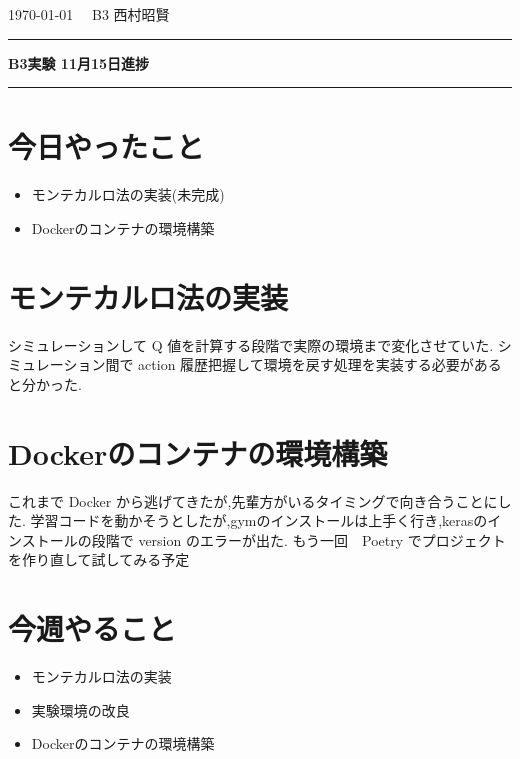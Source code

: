 \documentclass{jarticle}     %
\begin{document}
  \noindent
  \onecolumn
  \hspace{1em}
  \today
  \hfill
  \ \  B3 西村昭賢 

  \vspace{2mm}
  \hrule
  \begin{center}
  {\Large \bf B3実験 11月15日進捗}
  \end{center}
  \hrule
  \vspace{3mm}

\section{今日やったこと}

\begin{itemize}
  \item モンテカルロ法の実装(未完成)
  \item Dockerのコンテナの環境構築
\end{itemize}

\section{モンテカルロ法の実装}
シミュレーションして Q 値を計算する段階で実際の環境まで変化させていた.
シミュレーション間で action 履歴把握して環境を戻す処理を実装する必要があると分かった.

\section{Dockerのコンテナの環境構築}
これまで Docker から逃げてきたが,先輩方がいるタイミングで向き合うことにした.
学習コードを動かそうとしたが,gymのインストールは上手く行き,kerasのインストールの段階で version のエラーが出た.
もう一回　Poetry でプロジェクトを作り直して試してみる予定

\section{今週やること}

\begin{itemize}
  \item モンテカルロ法の実装
  \item 実験環境の改良
  \item Dockerのコンテナの環境構築
\end{itemize}




\end{document}
